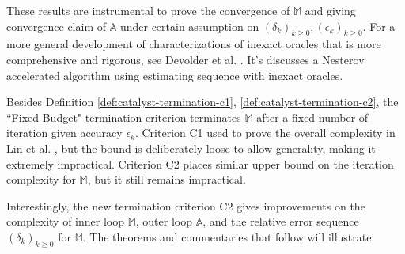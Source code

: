 \documentclass[12pt]{article}
\begin{document}
            These results are instrumental to prove the convergence of $\mathbb M$ and giving convergence claim of $\mathbb A$ under certain assumption on $(\delta_k)_{k \ge 0}, (\epsilon_k)_{k \ge0}$. 
            For a more general development of characterizations of inexact oracles that is more comprehensive and rigorous, see 
            Devolder et al. \cite{devolder_first-order_2014}. 
            It's discusses a Nesterov accelerated algorithm using estimating sequence with inexact oracles. 
            \par
            Besides Definition \ref{def:catalyst-termination-c1}, \ref{def:catalyst-termination-c2}, the ``Fixed Budget" termination criterion terminates $\mathbb M$ after a fixed number of iteration given accuracy $\epsilon_k$. 
            Criterion C1 used to prove the overall complexity in Lin et al. \cite{lin_universal_2015}, but the bound is deliberately loose to allow generality, making it extremely impractical. 
            Criterion C2 places similar upper bound on the iteration complexity for $\mathbb M$, but it still remains impractical. 
            \par
            Interestingly, the new termination criterion C2 gives improvements on the complexity of inner loop $\mathbb M$, outer loop $\mathbb A$, and the relative error sequence $(\delta_k)_{k \ge0}$ for $\mathbb M$. 
            The theorems and commentaries that follow will illustrate. 
\end{document}
